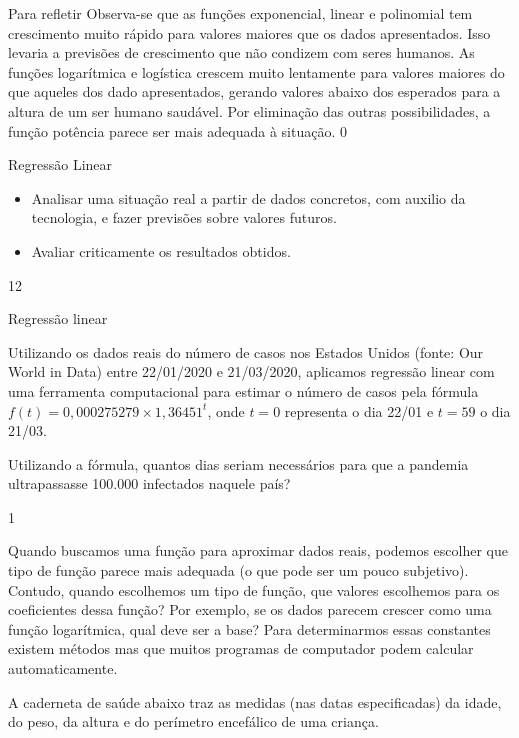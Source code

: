 \begin{answer}{Para refletir}
{
	Observa-se que as funções exponencial, linear e polinomial tem crescimento muito rápido para valores maiores que os dados apresentados. Isso levaria a previsões de crescimento que não condizem com seres humanos. As funções logarítmica e logística crescem muito lentamente para valores maiores do que aqueles dos dado apresentados, gerando valores abaixo dos esperados para a altura de um ser humano saudável. Por eliminação das outras possibilidades, a função potência parece ser mais adequada à situação.
}{0}
\end{answer}

\begin{objectives}{Regressão Linear}
{
	\begin{itemize}
	\item Analisar uma situação real a partir de dados concretos, com auxilio da tecnologia, e fazer previsões sobre valores futuros.
	\item Avaliar criticamente os resultados obtidos.
	\end{itemize}
}{1}{2}
\end{objectives}
\begin{answer}{Regressão linear}
{
	Utilizando os dados reais do número de casos nos Estados Unidos (fonte: Our World in Data) entre 22/01/2020 e 21/03/2020, aplicamos regressão linear com uma ferramenta computacional para estimar o número de casos pela fórmula $f(t) = 0{,}000275279 \times 1{,}36451^t$, onde $t=0$ representa o dia 22/01 e $t= 59$ o dia 21/03. %

	Utilizando a fórmula, quantos dias seriam necessários para que a pandemia ultrapassasse 100.000 infectados naquele país?
}{1}
\end{answer}



Quando buscamos uma função para aproximar dados reais, podemos escolher que tipo de função parece mais adequada (o que pode ser um pouco subjetivo). Contudo, quando escolhemos um tipo de função, que valores escolhemos para os coeficientes dessa função? Por exemplo, se os dados parecem crescer como uma função logarítmica, qual deve ser a base? Para determinarmos essas constantes existem métodos mas que muitos programas de computador podem calcular automaticamente.

A caderneta de saúde abaixo traz as medidas (nas datas especificadas) da idade, do peso, da altura e do perímetro encefálico de uma criança.


